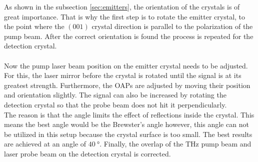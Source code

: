 As shown in the subsection \ref{sec:emitters}, the orientation of the crystals is of great importance.
That is why the first step is to rotate the emitter crystal, to the point where the $(001)$ crystal direction is parallel to the polarization of the pump beam.
After the correct orientation is found the process is repeated for the detection crystal.
\\\\
Now the pump laser beam position on the emitter crystal needs to be adjusted.
For this, the laser mirror before the crystal is rotated until the signal is at its greatest strength.
Furthermore, the OAPs are adjusted by moving their position and orientation slightly.
The signal can also be increased by rotating the detection crystal so that the probe beam does not hit it perpendicularly.
\\
The reason is that the angle limits the effect of reflections inside the crystal.
This means the best angle would be the Brewster's angle however, this angle can not be utilized in this setup because the crystal surface is too small. 
The best results are achieved at an angle of $\SI{40}{\degree}$.
Finally, the overlap of the $\si{\tera\hertz}$ pump beam and laser probe beam on the detection crystal is corrected.

\FloatBarrier
